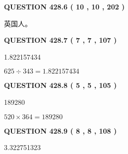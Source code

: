 \documentclass{ctexart}
\begin{document}
\vspace{0.2in}
  
{\textbf{\Large{QUESTION
428.6 
 ( 10 , 10 , 202 )
}}}
  
  
 
 
\noindent{}
 
 
英国人。
 
 
 
 
  
\vspace{0.2in}
  
{\textbf{\Large{QUESTION
428.7 
 ( 7 , 7 , 107 )
}}}
  
  
 
 
\noindent{}

1.822157434
 
 
 
 
\noindent{}

$ %
625 \div  %
343=   %
1.822157434$
 
 
  
\vspace{0.2in}
  
{\textbf{\Large{QUESTION
428.8 
 ( 5 , 5 , 105 )
}}}
  
  
 
 
\noindent{}

189280
 
 
 
 
\noindent{}

$ %
520 \times  %
364=   %
189280$
 
 
  
\vspace{0.2in}
  
{\textbf{\Large{QUESTION
428.9 
 ( 8 , 8 , 108 )
}}}
  
  
 
 
\noindent{}

3.322751323
 
 
 
 
\noindent{}
\end{document}
